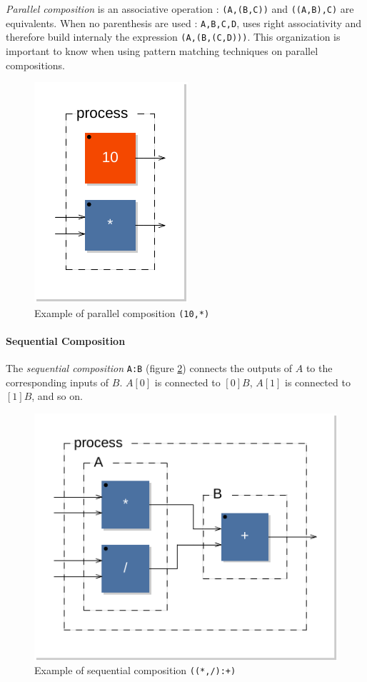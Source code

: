 \documentclass[a4paper,10pt]{book}
\begin{document}
\emph{Parallel composition} is an associative operation : \lstinline$(A,(B,C))$ and \lstinline$((A,B),C)$ are equivalents. When no parenthesis are used : \lstinline'A,B,C,D', \faust uses right associativity and therefore build internaly the expression \lstinline$(A,(B,(C,D)))$. This organization is important to know when using pattern matching techniques on parallel compositions. 

\begin{figure}[h]
\centering
\includegraphics[scale=0.7]{images/par1}
\caption{Example of parallel composition  \lstinline'(10,*)'}
\label{figure:par1}
\end{figure}


\paragraph{Sequential Composition}
The \emph{sequential composition}  \lstinline$A:B$ (figure \ref{figure:seq1}) connects the outputs of  $A$ to the corresponding inputs of  $B$.  $A[0]$ is connected to $[0]B$,   $A[1]$ is connected to $[1]B$, and so on. 

\begin{figure}[h]
\centering 
\includegraphics[scale=0.7]{images/seq1}
\caption{Example of sequential composition  \lstinline'((*,/):+)' } 
\label{figure:seq1}
\end{figure}
\end{document}
